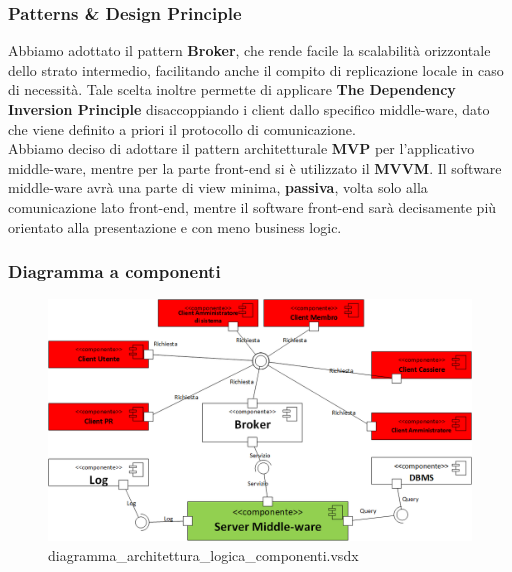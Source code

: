 \documentclass[a4paper]{article}
\begin{document}
\subsubsection{Patterns \& Design Principle}
Abbiamo adottato il pattern \textbf{Broker}, che rende facile la scalabilità orizzontale dello strato intermedio, facilitando anche il compito di replicazione locale in caso di necessità. Tale scelta inoltre permette di applicare \textbf{The Dependency Inversion Principle} disaccoppiando i client dallo specifico middle-ware, dato che viene definito a priori il protocollo di comunicazione.\\Abbiamo deciso di adottare il pattern architetturale \textbf{MVP} per l'applicativo middle-ware, mentre per la parte front-end si è utilizzato il \textbf{MVVM}. Il software middle-ware avrà una parte di view minima, \textbf{passiva}, volta solo alla comunicazione lato front-end, mentre il software front-end sarà decisamente più orientato alla presentazione e con meno business logic.







\subsubsection{Diagramma a componenti}

\begin{figure}[H]
    \includegraphics[scale=0.55]{Progettazione/diagramma_architettura_logica_componenti.png}
    \centering
    \caption{diagramma\_architettura\_logica\_componenti.vsdx}
\end{figure}
\end{document}
